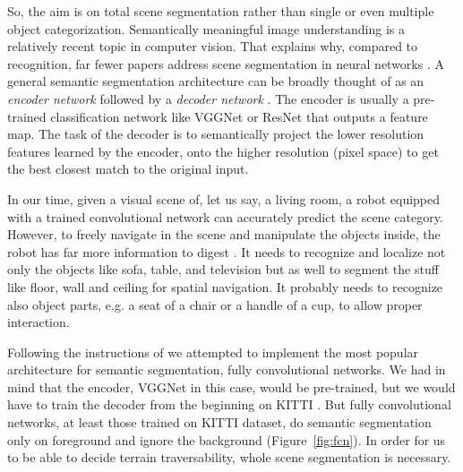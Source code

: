 \documentclass[12pt,a4paper,table,dvipsnames,tikz]{report}
\newcommand{\term}{\textit}
\newcommand{\acronym}{\MakeUppercase}
\newcommand{\bl}[1]{{\hypersetup{linkcolor=blue}#1}}
\begin{document}
	So, the aim is on total scene segmentation rather than single or even multiple object 
	categorization. Semantically meaningful image understanding is a relatively recent topic 
	in computer vision. That explains why, compared to recognition, far fewer papers address 
	scene segmentation in neural networks \cite{Wang}. A general semantic segmentation 
	architecture can be broadly thought of as an \term{encoder network} followed by a 
	\term{decoder network} \citep{Le}. The encoder is usually a pre-trained classification 
	network like VGGNet or ResNet that outputs a feature map. The task of the decoder is 
	to semantically project the lower resolution features learned by the encoder, onto the 
	higher resolution (pixel space) to get the best closest match to the original input.
	\par
	In our time, given a visual scene of, let us say, a living room, a robot equipped with 
	a trained convolutional network can accurately predict the scene category. However, to 
	freely navigate in the scene and manipulate the objects inside, the robot has far more 
	information to digest \citep{Zhou_sem}. It needs to recognize and localize not only the 
	objects like sofa, table, and television but as well to segment the stuff like floor, 
	wall and ceiling for spatial navigation. It probably needs to recognize also object parts, 
	e.g. a seat of a chair or a handle of a cup, to allow proper interaction.
	\par
	Following the instructions of \citet{Le} we attempted to implement the most popular 
	architecture for semantic segmentation, fully convolutional networks. We had in mind 
	that the encoder, VGGNet in this case, would be pre-trained, but we would have to 
	train the decoder from the beginning on \acronym{kitti} \citep{kitti}. But fully 
	convolutional networks, at least those trained on \acronym{kitti} dataset, do semantic 
	segmentation only on foreground and ignore the background (Figure~\bl{\ref{fig:fcn}}). In 
	order for us to be able to decide terrain traversability, whole scene segmentation is 
	necessary.
	\\
	
\end{document}

